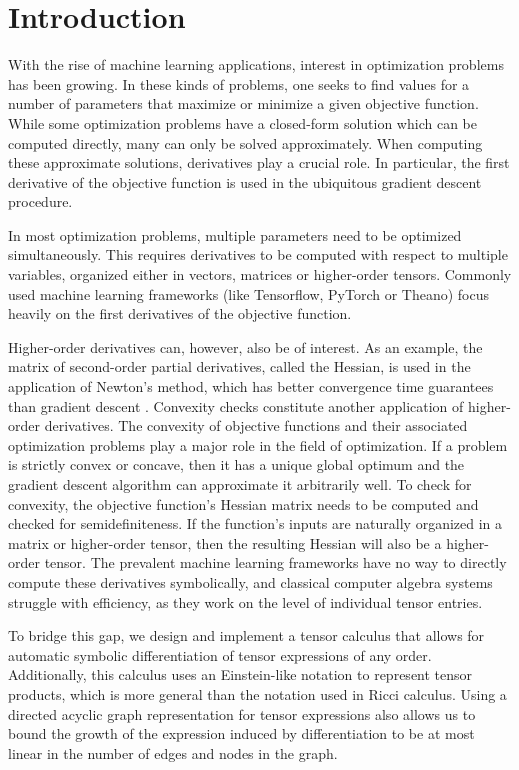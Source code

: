 \documentclass[12pt, a4paper]{report} %
\begin{document}
\clearpage
\tableofcontents
\clearpage

\setcounter{page}{5}
\chapter{Introduction}

With the rise of machine learning applications, interest in optimization problems has been growing.
In these kinds of problems, one seeks to find values for a number of parameters that maximize or minimize a given objective function.
While some optimization problems have a closed-form solution which can be computed directly, many can only be solved approximately.
When computing these approximate solutions, derivatives play a crucial role.
In particular, the first derivative of the objective function is used in the ubiquitous gradient descent procedure.

In most optimization problems, multiple parameters need to be optimized simultaneously.
This requires derivatives to be computed with respect to multiple variables, organized either in vectors, matrices or higher-order tensors.
Commonly used machine learning frameworks (like Tensorflow, PyTorch or Theano) focus heavily on the first derivatives of the objective function.

Higher-order derivatives can, however, also be of interest.
As an example, the matrix of second-order partial derivatives, called the Hessian, is used in the application of Newton's method, which has better convergence time guarantees than gradient descent \cite{newtons}.
Convexity checks constitute another application of higher-order derivatives.
The convexity of objective functions and their associated optimization problems play a major role in the field of optimization.
If a problem is strictly convex or concave, then it has a unique global optimum and the gradient descent algorithm can approximate it arbitrarily well.
To check for convexity, the objective function's Hessian matrix needs to be computed and checked for semidefiniteness.
If the function's inputs are naturally organized in a matrix or higher-order tensor, then the resulting Hessian will also be a higher-order tensor.
The prevalent machine learning frameworks have no way to directly compute these derivatives symbolically, and classical computer algebra systems struggle with efficiency, as they work on the level of individual tensor entries.

To bridge this gap, we design and implement a tensor calculus that allows for automatic symbolic differentiation of tensor expressions of any order.
Additionally, this calculus uses an Einstein-like notation to represent tensor products, which is more general than the notation used in Ricci calculus.
Using a directed acyclic graph representation for tensor expressions also allows us to bound the growth of the expression induced by differentiation to be at most linear in the number of edges and nodes in the graph.
\end{document}
